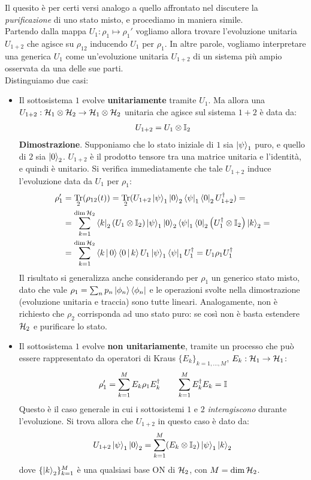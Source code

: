 \documentclass[../../InformazioneQuantistica.tex]{subfiles}
\begin{document}
Il quesito è per certi versi analogo a quello affrontato nel discutere la \textit{purificazione} di uno stato misto, e procediamo in maniera simile.\\
Partendo dalla mappa $U_1:\rho_1\mapsto \rho_1'$ vogliamo allora trovare l'evoluzione unitaria $U_{1+2}$ che agisce su $\rho_{12}$ inducendo $U_1$ per $\rho_1$. In altre parole, vogliamo interpretare una generica  $U_1$ come un'evoluzione unitaria $U_{1+2}$ di un sistema più ampio osservata da una delle sue parti.\\

Distinguiamo due casi:
\begin{itemize}
\item Il sottosistema $1$ evolve \textbf{unitariamente} tramite $U_1$. Ma allora una $U_{1+2}: \mathcal{H}_1 \otimes \mathcal{H}_2 \to \mathcal{H}_1 \otimes \mathcal{H}_2$ unitaria che agisce sul sistema $1+2$ è  data da:
\begin{align*}
U_{1+2} = U_1 \otimes \mathbb{I}_2
\end{align*}
\textbf{Dimostrazione}.
Supponiamo che lo stato iniziale di $1$ sia $\Ket{\psi}_1$ puro, e quello di $2$ sia $\Ket{0}_2$. $U_{1+2}$ è il prodotto tensore tra una matrice unitaria e l'identità, e quindi è unitario. Si verifica immediatamente che tale $U_{1+2}$ induce l'evoluzione data da $U_1$ per $\rho_1$:
\begin{align*}
\rho_1' &= \underset{2}{\operatorname{Tr}}(\rho_{12}(t)) = \underset{2}{\operatorname{Tr}}(U_{1+2}\Ket{\psi}_1\Ket{0}_{2}\Bra{\psi}_1\Bra{0}_{2}U_{1+2}^\dag)=\\
&= \sum_{k=1}^{\operatorname{dim}\mathcal{H}_2} \Bra{k}_2 \left(U_1 \otimes \mathbb{I}_2\right)\Ket{\psi}_1\Ket{0}_{2}\Bra{\psi}_1\Bra{0}_{2}\left(U_1^\dag \otimes \mathbb{I}_2\right)\Ket{k}_2 =\\
&=\sum_{k=1}^{\operatorname{dim}\mathcal{H}_2} \Braket{k|0}\Braket{0|k} U_1 \Ket{\psi}_1 \Bra{\psi}_1 U_1^\dag =U_1 \rho_1 U_1^\dag
\end{align*}
Il risultato si generalizza anche considerando per $\rho_1$ un generico stato misto, dato che vale $\rho_1 = \sum_n p_n\Ket{\phi_n}\Bra{\phi_n}$ e le operazioni svolte nella dimostrazione (evoluzione unitaria e traccia) sono tutte lineari. Analogamente, non è richiesto che $\rho_2$ corrisponda ad uno stato puro: se così non è basta estendere $\mathcal{H}_2$ e purificare lo stato.
\item Il sottosistema $1$ evolve \textbf{non unitariamente}, tramite un processo che può essere rappresentato da operatori di Kraus $\{E_k\}_{k=1,\dots,M}$, $E_k:\mathcal{H}_1 \to \mathcal{H}_1$:
\begin{align}
\rho_1' = \sum_{k=1}^M E_k \rho_1 E_k^\dag \qquad \sum_{k=1}^M E_k^\dag E_k = \mathbb{I}
\label{eqn:def-kraus}
\end{align}
Questo è il caso generale in cui i sottosistemi $1$ e $2$ \textit{interagiscono} durante l'evoluzione. Si trova allora che $U_{1+2}$ in questo caso è dato da:
\begin{align}
U_{1+2}\Ket{\psi}_1 \Ket{0}_2 = \sum_{k=1}^M (E_k \otimes \mathbb{I}_2) \Ket{\psi}_1 \Ket{k}_2
\label{eqn:U-def}
\end{align}
dove $\{\Ket{k}_2\}_{k=1}^M$ è una qualsiasi base ON di $\mathcal{H}_{2}$, con $M=\operatorname{dim}\mathcal{H}_2$.
\end{itemize}
\end{document}
